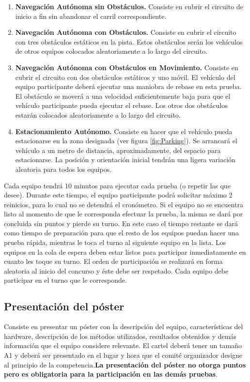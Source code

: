 \documentclass[letterpaper,12pt]{article}
\begin{document}
\begin{enumerate}
\item \textbf{Navegación Autónoma sin Obstáculos.} Consiste en cubrir el circuito de inicio a fin sin abandonar el carril correspondiente.
\item \textbf{Navegación Autónoma con Obstáculos.} Consiste en cubrir el circuito con tres obstáculos estáticos en la pista. Estos obstáculos serán los vehículos de otros equipos colocados aleatoriamente a lo largo del circuito.
\item \textbf{Navegación Autónoma con Obstáculos en Movimiento.} Consiste en cubrir el circuito con dos obstáculos estáticos y uno móvil. El vehículo del equipo participante deberá ejecutar una maniobra de rebase en esta prueba. El obstáculo se moverá a una velocidad suficientemente baja para que el vehículo participante pueda ejecutar el rebase. Los otros dos obstáculos estarán colocados aleatoriamente a lo largo del circuito.
  \item \textbf{Estacionamiento Autónomo.} Consiste en hacer que el vehículo pueda estacionarse en la zona designada (ver figura \ref{fig:Parking}). Se arrancará el vehículo a un metro de distancia, aproximadamente, del espacio para estacionarse. La posición y orientación inicial tendrán una ligera variación aleatoria para todos los equipos. 
\end{enumerate}

Cada equipo tendrá 10 minutos para ejecutar cada prueba (o repetir las que desee). Durante este tiempo, el equipo participante podrá solicitar máximo 2 reinicios, para lo cual no se detendrá el cronómetro. Si el equipo no se encuentra listo al momento de que le corresponda
efectuar la prueba, la misma se dará por concluida sin puntos y pierde su turno. En este caso el tiempo restante se dará como tiempo de preparación para que el resto de los equipos puedan hacer una prueba rápida, mientras le toca el turno al siguiente equipo en la lista. Los equipos en la cola de espera deben estar listos para participar inmediatamente en cuanto les toque su turno. El orden de participación se realizará en forma aleatoria al inicio del concurso y éste debe ser respetado. Cada equipo debe participar en el turno que le corresponde.

\subsection{Presentación del póster}
Consiste en presentar un póster con la descripción del equipo, características del hardware, descripción de los métodos utilizados, resultados obtenidos y demás información que el equipo considere relevante. El cartel deberá tener un tamaño A1 y deberá ser presentado en el lugar y hora que el comité organizador designe al principio de la competencia.\textbf{La presentación del póster no otorga puntos pero es obligatoria para la participación en las demás pruebas}.
\end{document}
